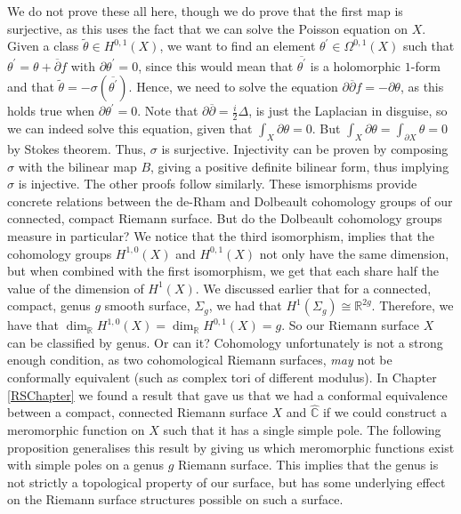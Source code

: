 \documentclass[11pt]{report}
\theoremstyle{definition}
\newenvironment{sproof}{%
  \renewcommand{\proofname}{Sketch Proof}\proof}{\endproof}
\begin{document}
\begin{sproof}
  We do not prove these all here, though we do prove that the first map is surjective, as this uses the fact that we can solve the Poisson equation on $X$. Given a class $\tilde{\theta} \in H^{0,1}(X)$, we want to find an element  $\theta^{\prime} \in \Omega^{0,1}(X)$ such that $\theta^{\prime} = \theta + \overline{\partial}f$ with $\partial \theta^{\prime} = 0$, since this would mean that $\overline{\theta^{\prime}}$ is a holomorphic $1$-form and that $\tilde{\theta} = -\sigma(\overline{\theta^{\prime}})$. Hence, we need to solve the equation $\partial\overline{\partial}f = -\partial \theta$, as this holds true when $\partial\theta^{\prime}=0$. Note that $\partial\overline{\partial} = \frac{i}{2}\Delta$, is just the Laplacian in disguise, so we can indeed solve this equation, given that $\int_X\partial \theta = 0$. But $\int_X\partial \theta = \int_{\partial X}\theta = 0$ by Stokes theorem. Thus, $\sigma$ is surjective. Injectivity can be proven by composing $\sigma$ with the bilinear map $B$, giving a positive definite bilinear form, thus implying $\sigma$ is injective. 
  The other proofs follow similarly.
\end{sproof}
These ismorphisms provide concrete relations between the de-Rham and Dolbeault cohomology groups of our connected, compact Riemann surface. But do the Dolbeault cohomology groups measure in particular? We notice that the third isomorphism, implies that the cohomology groups $H^{1,0}(X)$ and $H^{0,1}(X)$ not only have the same dimension, but when combined with the first isomorphism, we get that each share half the value of the dimension of $H^1(X)$. We discussed earlier that for a connected, compact, genus $g$ smooth surface, $\Sigma_g$, we had that $H^1(\Sigma_g)\cong\mathbb{R}^{2g}$. Therefore, we have that $\dim_{\mathbb{R}}H^{1,0}(X)=\dim_{\mathbb{R}}H^{0,1}(X)=g$. So our Riemann surface $X$ can be classified by genus. Or can it? Cohomology unfortunately is not a strong enough condition, as two cohomological Riemann surfaces, \emph{may} not be conformally equivalent (such as complex tori of different modulus). In Chapter \ref{RSChapter} we found a result that gave us that we had a conformal equivalence between a compact, connected Riemann surface $X$ and $\widehat{\mathbb{C}}$ if we could construct a meromorphic function on $X$ such that it has a single simple pole. The following proposition generalises this result by giving us which meromorphic functions exist with simple poles on a genus $g$ Riemann surface. This implies that the genus is not strictly a topological property of our surface, but has some underlying effect on the Riemann surface structures possible on such a surface.
\end{document}

